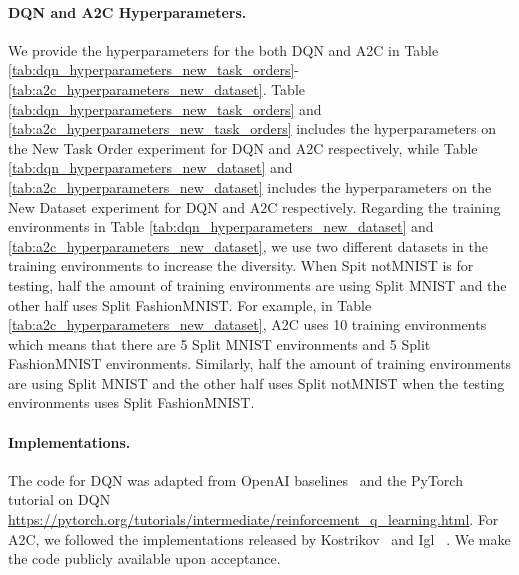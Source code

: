 \paragraph{DQN and A2C Hyperparameters.}
We provide the hyperparameters for the both DQN and A2C in Table \ref{tab:dqn_hyperparameters_new_task_orders}-\ref{tab:a2c_hyperparameters_new_dataset}. Table \ref{tab:dqn_hyperparameters_new_task_orders} and \ref{tab:a2c_hyperparameters_new_task_orders} includes the hyperparameters on the New Task Order experiment for DQN and A2C respectively, while Table \ref{tab:dqn_hyperparameters_new_dataset} and \ref{tab:a2c_hyperparameters_new_dataset} includes the hyperparameters on the New Dataset experiment for DQN and A2C respectively. Regarding the training environments in Table \ref{tab:dqn_hyperparameters_new_dataset} and \ref{tab:a2c_hyperparameters_new_dataset}, we use two different datasets in the training environments to increase the diversity. When Spit notMNIST is for testing, half the amount of training environments are using Split MNIST and the other half uses Split FashionMNIST. For example, in Table \ref{tab:a2c_hyperparameters_new_dataset}, A2C uses 10 training environments which means that there are 5 Split MNIST environments and 5 Split FashionMNIST environments. Similarly, half the amount of training environments are using Split MNIST and the other half uses Split notMNIST when the testing environments uses Split FashionMNIST.   

\vspace{-3mm}
\paragraph{Implementations.} 
The code for DQN was adapted from OpenAI baselines~ and the PyTorch~ tutorial on DQN {\small \url{https://pytorch.org/tutorials/intermediate/reinforcement_q_learning.html}}. For A2C, we followed the implementations released by Kostrikov~ and Igl \etal~. We make the code publicly available upon acceptance. 


